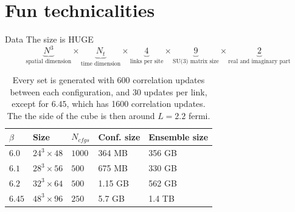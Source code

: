 \documentclass[10pt]{beamer}
\begin{document}
\section{Fun technicalities}
\begin{frame}{Data}
	The size is HUGE
	\begin{equation}\nonumber
		\underbrace{N^3}_\text{spatial dimension} \times
		\underbrace{N_t}_\text{time dimension} \times
		\underbrace{4}_\text{links per site} \times 
		\underbrace{9}_\text{SU(3) matrix size} \times
		\underbrace{2}_\text{real and imaginary part}
	\end{equation}
	\begin{table}
		\caption{Every set is generated with 600 correlation updates between each configuration, and 30 updates per link, except for $6.45$, which has 1600 correlation updates. The the side of the cube is then around $L=2.2$ fermi.}
		\begin{tabular}{l | l | l | l | l}
			$\beta$ & Size & $N_{cfgs}$ & Conf. size & Ensemble size \\ \hline
			$6.0$ & $24^3\times 48$ & $1000$ & 364 MB & 356 GB \\
			$6.1$ & $28^3\times 56$ & $500$ & 675 MB & 330 GB\\
			$6.2$ & $32^3\times 64$ & $500$ & 1.15 GB & 562 GB\\
			$6.45$ & $48^3\times 96$ & $250$ & 5.7 GB & 1.4 TB\\
		\end{tabular}
		\label{tab:data_batches}
	\end{table}
\end{frame}
\end{document}

